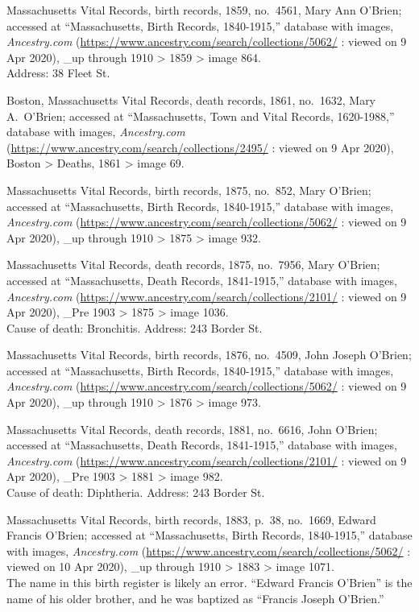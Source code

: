 \begin{thebibliography}{999}
	Massachusetts Vital Records, birth records, 1859, no.\ 4561, Mary Ann O'Brien; accessed at ``Massachusetts, Birth Records, 1840-1915,'' database with images, \textit{Ancestry.com} (\url{https://www.ancestry.com/search/collections/5062/} : viewed on 9 Apr 2020), \_up through 1910 > 1859 > image 864.\\
	Address: 38 Fleet St.
	
	Boston, Massachusetts Vital Records, death records, 1861, no.\ 1632, Mary A.\ O'Brien; accessed at ``Massachusetts, Town and Vital Records, 1620-1988,'' database with images, \textit{Ancestry.com} (\url{https://www.ancestry.com/search/collections/2495/} : viewed on 9 Apr 2020), Boston > Deaths, 1861 > image 69.
	
	Massachusetts Vital Records, birth records, 1875, no.\ 852, Mary O'Brien; accessed at ``Massachusetts, Birth Records, 1840-1915,'' database with images, \textit{Ancestry.com} (\url{https://www.ancestry.com/search/collections/5062/} : viewed on 9 Apr 2020), \_up through 1910 > 1875 > image 932.
	
	Massachusetts Vital Records, death records, 1875, no.\ 7956, Mary O'Brien; accessed at ``Massachusetts, Death Records, 1841-1915,'' database with images, \textit{Ancestry.com} (\url{https://www.ancestry.com/search/collections/2101/} : viewed on 9 Apr 2020), \_Pre 1903 > 1875 > image 1036.\\
	Cause of death: Bronchitis. Address: 243 Border St.
	
	Massachusetts Vital Records, birth records, 1876, no.\ 4509, John Joseph O'Brien; accessed at ``Massachusetts, Birth Records, 1840-1915,'' database with images, \textit{Ancestry.com} (\url{https://www.ancestry.com/search/collections/5062/} : viewed on 9 Apr 2020), \_up through 1910 > 1876 > image 973.
	
	Massachusetts Vital Records, death records, 1881, no.\ 6616, John O'Brien; accessed at ``Massachusetts, Death Records, 1841-1915,'' database with images, \textit{Ancestry.com} (\url{https://www.ancestry.com/search/collections/2101/} : viewed on 9 Apr 2020), \_Pre 1903 > 1881 > image 982.\\
	Cause of death: Diphtheria. Address: 243 Border St.
	
	Massachusetts Vital Records, birth records, 1883, p.\ 38, no.\ 1669, Edward Francis O'Brien; accessed at ``Massachusetts, Birth Records, 1840-1915,'' database with images, \textit{Ancestry.com} (\url{https://www.ancestry.com/search/collections/5062/} : viewed on 10 Apr 2020), \_up through 1910 > 1883 > image 1071.\\
	The name in this birth register is likely an error. ``Edward Francis O'Brien'' is the name of his older brother, and he was baptized as ``Francis Joseph O'Brien.''
	

\end{thebibliography}
